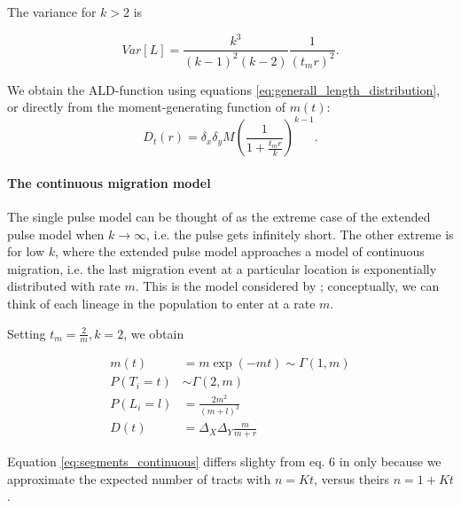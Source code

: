 \documentclass[11pt]{article}
\let\oldparagraph\paragraph
\renewcommand{\paragraph}[1]{\oldparagraph{#1}\mbox{}}
\begin{document}
The variance for $k>2$ is 
	
\begin{equation}
\label{eq:Var_l_extended_pulse}
	Var[L] = \frac{k^3}{(k-1)^2 (k-2)} \frac{1}{(t_m r)^2}\text{.}
\end{equation}
	
We obtain the ALD-function using equations \ref{eq:generall_length_distribution}, or directly from the moment-generating function of $m(t)$:
\begin{equation}
\label{eq:extended_pulse_tail}
D_t(r) = \delta_x\delta_y M\left( \frac{1}{1 + \frac{t_m r}{k}}\right) ^{k-1} \text{.}
\end{equation}

	
\paragraph{The continuous migration model}

The single pulse model can be thought of as the extreme case of the extended pulse model when $k \to \infty$, i.e. the pulse gets infinitely short. The other extreme is for low $k$, where the extended pulse model approaches a model of continuous migration, i.e. the last migration event at a particular location is exponentially distributed with rate $m$. This is the model considered by \cite{pool_inference_2009}; conceptually, we can think of each lineage in the population to enter at a rate $m$. 
	
Setting $t_m = \frac{2}{m}, k=2$, we obtain

\begin{subequations}
\begin{align}
    m(t) &= m \exp(-mt) \sim \Gamma(1, m)\\
    P(T_i=t) &\sim \Gamma\left(2, m\right)\\
	P(L_i=l) &= \frac{2m^2}{(m+l)^3}\label{eq:segments_continuous}\\
	D(t) &= \Delta_X\Delta_Y \frac{m}{m + r}
\end{align}
\end{subequations}
	
Equation \ref{eq:segments_continuous} differs slighty from eq. 6 in \cite{pool_inference_2009} only because we approximate the expected number of tracts with $n=Kt$, versus theirs $n=1+Kt$. 
	
\end{document}

